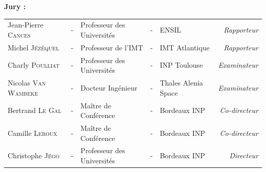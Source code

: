 \documentclass[a4paper, 11pt]{article}
\begin{document}
          \noindent \large \textbf{Jury :} \\
          \vspace*{-1.5em}
          \begin{center}
            \begin{tabular}{lclclr}
              Jean-Pierre \textsc{Cances}  &-& Professeur des Universités & - & ENSIL                & \textit{Rapporteur}   \\
              Michel \textsc{Jézéquel}     & - & Professeur de l'IMT & - & IMT Atlantique                & \textit{Rapporteur}   \\
              Charly \textsc{Poulliat}          & - & Professeur des Universités                      & - & INP Toulouse        & \textit{Examinateur}   \\
              Nicolas \textsc{Van Wambeke} & - & Docteur Ingénieur                  & - & Thales Alenia Space & \textit{Examinateur}  \\
              Bertrand \textsc{Le Gal}     & - & Maître de Conférence      & - & Bordeaux INP        & \textit{Co-directeur} \\
              Camille \textsc{Leroux}      & - & Maître de Conférence      & - & Bordeaux INP        & \textit{Co-directeur} \\
              Christophe \textsc{Jégo}     & - & Professeur des Universités & - & Bordeaux INP        & \textit{Directeur}    \\
            \end{tabular}
          \end{center}
          
          
          
        
\end{document}
